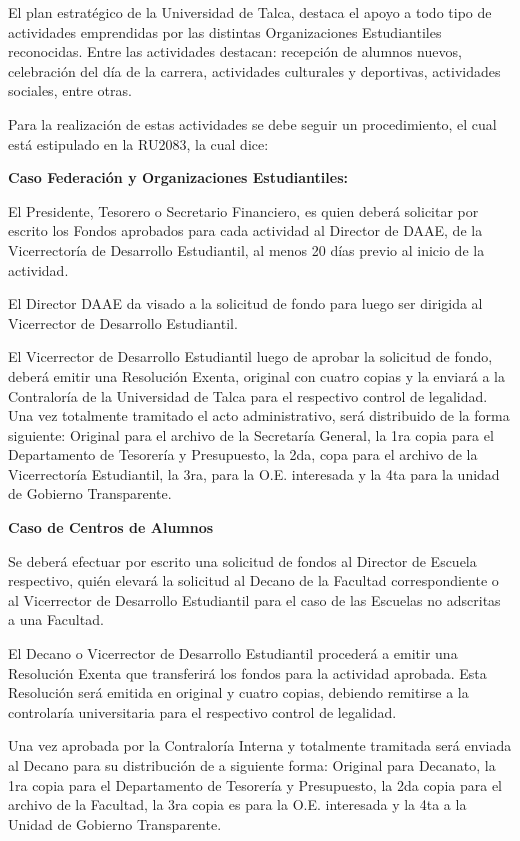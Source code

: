 El plan estratégico de la Universidad de Talca, destaca el apoyo a todo tipo de actividades emprendidas por las distintas Organizaciones Estudiantiles reconocidas. Entre las actividades destacan: recepción de alumnos nuevos, celebración del día de la carrera, actividades culturales y deportivas, actividades sociales, entre otras. \cite{5}

Para la realización de estas actividades se debe seguir un procedimiento, el cual está estipulado en la RU2083, la cual dice:

\begin{tasks}[counter-format = {tsk[A].}]
	\task \textbf{Caso Federación y Organizaciones Estudiantiles:}

	El Presidente, Tesorero o Secretario Financiero, es quien deberá solicitar por escrito los Fondos aprobados para cada actividad al Director de DAAE, de la Vicerrectoría de Desarrollo Estudiantil, al menos 20 días previo al inicio de la actividad.

	El Director DAAE da visado a la solicitud de fondo para luego ser dirigida al Vicerrector de Desarrollo Estudiantil.

	El Vicerrector de Desarrollo Estudiantil luego de aprobar la solicitud de fondo, deberá emitir una Resolución Exenta, original con cuatro copias y la enviará a la Contraloría de la Universidad de Talca para el respectivo control de legalidad. Una vez totalmente tramitado el acto administrativo, será distribuido de la forma siguiente: Original para el archivo de la Secretaría General, la 1ra copia  para el Departamento de Tesorería y Presupuesto, la 2da, copa para el archivo de la Vicerrectoría Estudiantil, la 3ra, para la O.E. interesada y la 4ta para la unidad de Gobierno Transparente.

	\task \textbf{Caso de Centros de Alumnos}

	Se deberá efectuar por escrito una solicitud de fondos al Director de Escuela respectivo, quién elevará la solicitud al Decano de la Facultad correspondiente o al Vicerrector de Desarrollo Estudiantil para el caso de las Escuelas no adscritas a una Facultad.

	El Decano o Vicerrector de Desarrollo Estudiantil procederá a emitir una Resolución Exenta que transferirá los fondos para la actividad aprobada. Esta Resolución será emitida en original y cuatro copias, debiendo remitirse a la controlaría universitaria para el respectivo control de legalidad.

	Una vez aprobada por la Contraloría Interna y totalmente tramitada será enviada al Decano para su distribución de a siguiente forma: Original para Decanato, la 1ra copia para el Departamento de Tesorería y Presupuesto, la 2da copia para el archivo de la Facultad, la 3ra copia es para la O.E. interesada y la 4ta a la Unidad de Gobierno Transparente.

\end{tasks}

